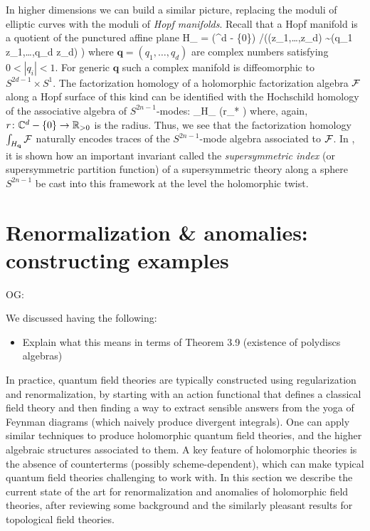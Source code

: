 \documentclass[11pt]{amsart}
\def\C{{\mathbb{C}}}
\renewcommand{\op}{\operatorname}
\def\owen#1{{\textcolor{violet!50!black}{OG: {#1}}}}
\begin{document}
In higher dimensions we can build a similar picture,
replacing the moduli of elliptic curves with the moduli of {\it Hopf manifolds}.
Recall that a Hopf manifold is a quotient of the punctured affine plane
\beqn
H_{} = \left(\C^d - \{0\}\right) \slash \left((z_1,\ldots,z_d) \sim (q_1 z_1,\ldots,q_d z_d) \right)
\eeqn
where $\mathbf{q} = (q_1,\ldots,q_d)$ are complex numbers satisfying $0 < |q_i| < 1$.
For generic $\mathbf{q}$ such a complex manifold is diffeomorphic to $S^{2d-1} \times S^1$.
The factorization homology of a holomorphic factorization algebra $\mathcal F$ along a Hopf surface of this kind can be identified with the Hochschild homology of the associative algebra of $S^{2n-1}$-modes:
\beqn
\int_{H_{}} \cF \simeq \op{Hoch}(r_* \cF)
\eeqn
where, again, $r\colon \C^d - \{0\} \to \RR_{>0}$ is the radius.
Thus, we see that the factorization homology $\int_{H_{\mathbf{q}}} \mathcal F$ naturally encodes traces of the $S^{2n-1}$-mode algebra associated to $\mathcal F$.
In \cite{SWchar}, it is shown how an important invariant called the \textit{supersymmetric index} (or supersymmetric partition function) of a supersymmetric theory along a sphere $S^{2n-1}$ be cast into this framework at the level the holomorphic twist.

\section{Renormalization \& anomalies: constructing examples}
\label{sec: renorm}

\owen{We discussed having the following:
\begin{itemize}
\item Explain what this means in terms of Theorem 3.9 (existence of polydiscs algebras)
\end{itemize}}

In practice, quantum field theories are typically constructed using regularization and renormalization,
by starting with an action functional that defines a classical field theory and then finding a way to extract sensible answers from the yoga of Feynman diagrams (which naively produce divergent integrals).
One can apply similar techniques to produce holomorphic quantum field theories, and the higher algebraic structures associated to them.
A key feature of holomorphic theories is the absence of counterterms (possibly scheme-dependent), 
which can make typical quantum field theories challenging to work with.
In this section we describe the current state of the art for renormalization and anomalies of holomorphic field theories,
after reviewing some background and the similarly pleasant results for topological field theories.
\end{document}
